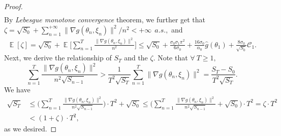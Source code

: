 \documentclass[standalone]{article}
\newtheorem{lem}{Lemma}[section]
\DeclareMathOperator{\Expect}{\mathbb{E}}
\begin{document}
\begin{proof}
\begin{align*}
\end{align*}
By \emph{Lebesgue monotone convergence} theorem, we further get that $\zeta=\sqrt{S_{0}}+\sum_{n=1}^{+\infty}\|\nabla g(\theta_{n},\xi_{n})\|^{2}\big/n^{2}<+\infty\ \ a.s.,$ and
\begin{equation}\label{zxc_10}\begin{aligned}
\Expect[\zeta]=\sqrt{S_{0}}+\Expect\bigg[\sum_{n=1}^{T}\frac{\|\nabla g(\theta_{n},\xi_{n})\|^{2}}{n^{2}}\bigg] \leq   \sqrt{S_{0}}+\frac{\sigma_{0}\sigma_{1}\pi^{2}}{6\sigma_{0}}+\frac{16\sigma_{0}}{\alpha_0} \hat{g}(\theta_1) + \frac{8\sigma_{0}}{\sqrt{S_0}}\mathcal{C}_1.
\end{aligned}\end{equation}
Next, we derive the relationship of $S_T$ and the $\zeta$. Note that $\forall\ T\ge 1,$
\[\sum_{n=1}^{T}\frac{\|\nabla g(\theta_{n},\xi_{n})\|^{2}}{n^{2}\sqrt{S_{n-1}}}>\frac{1}{T^{2}\sqrt{S_{T}}}\sum_{n=1}^{T}\|\nabla g(\theta_{n},\xi_{n})\|^{2}=\frac{S_T -S_0}{T^{2}\sqrt{S_{T}}} .\] We have
\begin{equation}\nonumber\begin{aligned}
\sqrt{S_T} &\leq \bigg(\sum_{n=1}^{T}\frac{\|\nabla g(\theta_{n},\xi_{n})\|^{2}}{n^{2}\sqrt{S_{n-1}}}\bigg) \cdot T^2+ \sqrt{S_0}  \leq \bigg(\sum_{n=1}^{T}\frac{\|\nabla g(\theta_{n},\xi_{n})\|^{2}}{n^{2}\sqrt{S_{n-1}}} + \sqrt{S_0} \bigg)\cdot T^2=\zeta\cdot T^{2}\\&<(1+\zeta)\cdot T^{2},
\end{aligned}\end{equation}
as we desired. 
\end{proof}







\end{document}
